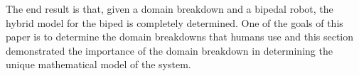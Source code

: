 The end result is that, given a domain breakdown and a bipedal robot, the hybrid model for the biped is completely determined. One of the goals of this paper is to determine the domain breakdowns that humans use and this section demonstrated the importance of the domain breakdown in determining the unique mathematical model of the system.
